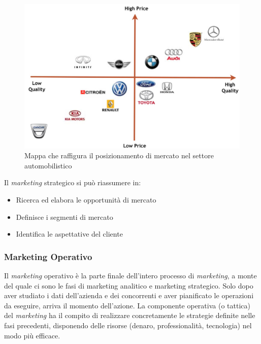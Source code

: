 \begin{figure}[H]
	\includegraphics[width=0.6\linewidth]{resources/chapters/OrganizzazioneAziendale/images/mappa-posizionamento.jpg}
	\centering
	\caption{Mappa che raffigura il posizionamento di mercato nel settore automobilistico}
\end{figure}

Il \textit{marketing} strategico si può riassumere in:
\begin{itemize}
	\item Ricerca ed elabora le opportunità di mercato
	\item Definisce i segmenti di mercato
	\item Identifica le aspettative del cliente
\end{itemize}

\newpage
\subsubsection{Marketing Operativo}
Il \textit{marketing} operativo è la parte finale dell’intero processo di \textit{marketing}, a monte del quale ci sono le fasi di marketing analitico e marketing strategico. Solo dopo aver studiato i dati dell’azienda e dei concorrenti e aver pianificato le operazioni da eseguire, arriva il momento dell’azione. La componente operativa (o tattica) del \textit{marketing} ha il compito di realizzare concretamente le strategie definite nelle fasi precedenti, disponendo delle risorse (denaro, professionalità, tecnologia) nel modo più efficace.

